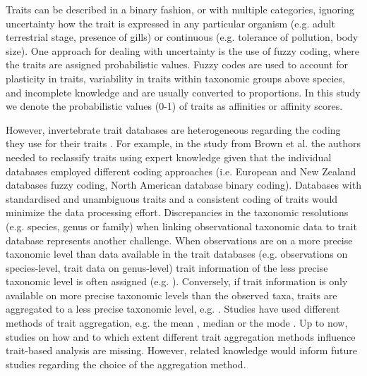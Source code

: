 \documentclass{article}
\begin{document}
Traits can be described in a binary fashion, or with multiple categories, ignoring uncertainty how the trait is expressed in any particular organism (e.g. adult terrestrial stage, presence of gills) or continuous (e.g. tolerance of pollution, body size). One approach for dealing with uncertainty is the use of fuzzy coding, where the traits are assigned probabilistic values. Fuzzy codes are used to account for plasticity in traits, variability in traits within taxonomic groups above species, and incomplete knowledge and are usually converted to proportions. In this study we denote the probabilistic values (0-1) of traits as affinities or affinity scores.

However, invertebrate trait databases are heterogeneous regarding the coding they use for their traits \cite{culp_incorporating_2011}. For example, in the study from Brown et al. \cite{brown_functional_2018} the authors needed to reclassify traits using expert knowledge given that the individual databases employed different coding approaches (i.e. European and New Zealand databases fuzzy coding, North American database binary coding). Databases with standardised and unambiguous traits and a consistent coding of traits would minimize the data processing effort. Discrepancies in the taxonomic resolutions (e.g. species, genus or family) when linking observational taxonomic data to trait database represents another challenge. When observations are on a more precise taxonomic level than data available in the trait databases (e.g. observations on species-level, trait data on genus-level) trait information of the less precise taxonomic level is often assigned (e.g. \cite{szocs_effects_2014, vos_taxonomic_2017}). Conversely, if trait information is only available on more precise taxonomic levels than the observed taxa, traits are aggregated to a less precise taxonomic level, e.g. \cite{poff_functional_2006, szocs_effects_2014, piliere_a._f._h._importance_2016, aspin_extreme_2019}. Studies have used different methods of trait aggregation, e.g. the mean \cite{magliozzi_functional_2019}, median \cite{szocs_effects_2014} or the mode \cite{piliere_a._f._h._importance_2016}. Up to now, studies on how and to which extent different trait aggregation methods influence trait-based analysis are missing. However, related knowledge would inform future studies regarding the choice of the aggregation method.
\end{document}

